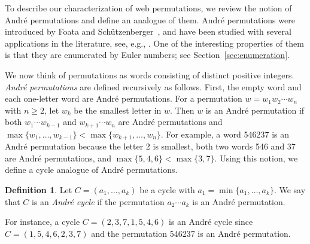\documentclass[reqno,12pt]{amsart}
\theoremstyle{definition}
\newtheorem{defn}[thm]{Definition}
\theoremstyle{remark}
\begin{document}
To describe our characterization of web permutations, we review the notion of
Andr\'e permutations and define an analogue of them.
Andr\'e permutations were introduced by Foata and Sch\"utzenberger~\cite{FSch73},
and have been studied with several applications in the literature, see, e.g., \cite{Sta94, FH16}.
One of the interesting properties of them is that they are enumerated by Euler numbers;
see Section~\ref{sec:enumeration}.

We now think of permutations as words consisting of distinct positive integers.
\emph{Andr\'e permutations} are defined recursively as follows.
First, the empty word and each one-letter word are Andr\'e permutations.
For a permutation \( w=w_1 w_2 \cdots w_n \) with \( n\ge 2 \), 
let \( w_k \) be the smallest letter in \( w \). Then \( w \) is an Andr\'e
permutation if both \( w_1 \cdots w_{k-1} \) and \( w_{k+1}\cdots w_{n} \) are 
Andr\'e permutations and \( \max\{w_1,\dots,w_{k-1}\} < \max\{w_{k+1},\dots,w_n\} \).
For example, a word 546237 is an Andr\'e permutation because
the letter 2 is smallest, both two words 546 and 37 are Andr\'e permutations,
and \( \max\{5,4,6\}<\max\{3,7\} \).
Using this notion, we define a cycle analogue of Andr\'e permutations.
\begin{defn} \label{def:Andre cycle}
  Let \( C=(a_1,\dots,a_k) \) be a cycle with \( a_1 = \min \{a_1,\dots,a_k\} \).
  We say that \( C \) is an \emph{Andr\'e cycle}
  if the permutation \( a_2\cdots a_k \) is an Andr\'e permutation.
\end{defn}
For instance, a cycle \( C = (2,3,7,1,5,4,6) \) is an Andr\'e cycle
since \( C = (1,5,4,6,2,3,7) \) and the permutation 546237 is an Andr\'e permutation.
\end{document}
